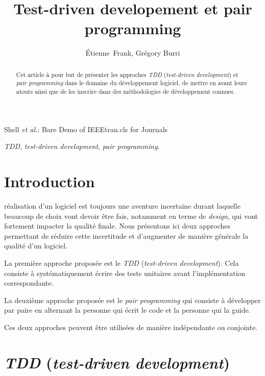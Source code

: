 \documentclass[journal, a4paper, frenchb]{IEEEtran}
\begin{document}
\title{Test-driven developement et pair programming}

\author{Étienne~Frank, Grégory Burri}

{Shell \MakeLowercase{\textit{et al.}}: Bare Demo of IEEEtran.cls for Journals}

\maketitle

\begin{abstract}
Cet article à pour but de présenter les approches \emph{TDD} (\emph{test-driven development}) et \emph{pair programming} dans le domaine du développement logiciel, de mettre en avant leurs atouts ainsi que de les inscrire dans des méthodologies de développement connues.
\end{abstract}

\begin{IEEEkeywords}
\emph{TDD}, \emph{test-driven development}, \emph{pair programming}.
\end{IEEEkeywords}

\IEEEpeerreviewmaketitle

\section{Introduction}

 réalisation d'un logiciel est toujours une aventure incertaine durant laquelle beaucoup de choix vont devoir être fais, notamment en terme de \emph{design}, qui vont fortement impacter la qualité finale. Nous présentons ici deux approches permettant de réduire cette incertitude et d'augmenter de manière générale la qualité d'un logiciel.

La première approche proposée est le \emph{TDD} (\emph{test-driven development}). Cela consiste à systématiquement écrire des tests unitaires avant l'implémentation correspondante.

La deuxième approche proposée est le \emph{pair programming} qui consiste à développer par paire en alternant la personne qui écrit le code et la personne qui la guide.

Ces deux approches peuvent être utilisées de manière indépendante ou conjointe.


\section{\emph{TDD} (\emph{test-driven development})}
\end{document}
